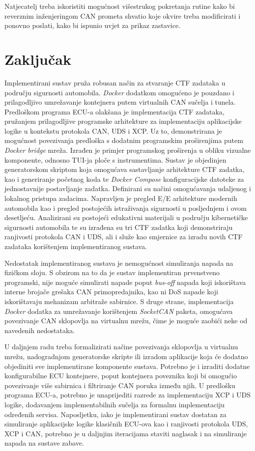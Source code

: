 \documentclass[times, utf8, diplomski, numeric]{fer}
\begin{document}
Natjecatelj treba iskoristiti mogućnost višestrukog pokretanja rutine kako bi reverznim inženjeringom CAN prometa shvatio koje okvire treba modificirati i ponovno poslati, kako bi ispunio uvjet za prikaz zastavice. 

\chapter{Zaključak}
Implementirani sustav pruža robusan način za stvaranje CTF zadataka u području sigurnosti automobila. \textit{Docker} dodatkom omogućeno je pouzdano i prilagodljivo umrežavanje kontejnera putem virtualnih CAN sučelja i tunela. Predloškom programa ECU-a olakšana je implementacija CTF zadataka, pružanjem prilagodljive programske arhitekture za implementaciju aplikacijske logike u kontekstu protokola CAN, UDS i XCP. Uz to, demonstrirana je mogućnost povezivanja predloška s dodatnim programskim proširenjima putem \textit{Docker bridge} mreža. Izrađen je primjer programskog proširenja u obliku vizualne komponente, odnosno TUI-ja ploče s instrumentima. Sustav je objedinjen generatorskom skriptom koja omogućava sastavljanje arhitekture CTF zadatka, kao i generiranje početnog koda te \textit{Docker Compose} konfiguracijske datoteke za jednostavnije postavljanje zadatka. Definirani su načini omogućavanja udaljenog i lokalnog pristupa zadacima. Napravljen je pregled E/E arhitekture modernih automobila kao i pregled postojećih istraživanja sigurnosti u posljednjem i ovom desetljeću. Analizirani su postojeći edukativni materijali u području kibernetičke sigurnosti automobila te su izrađena su tri CTF zadatka koji demonstriraju ranjivosti protokola CAN i UDS, ali i služe kao smjernice za izradu novih CTF zadataka korištenjem implementiranog sustava.

Nedostatak implementiranog sustava je nemogućnost simuliranja napada na fizičkom sloju. S obzirom na to da je sustav implementiran prvenstveno programski, nije moguće simulirati napade poput \textit{bus-off} napada koji iskorištava interne brojače grešaka CAN primopredajnika, kao ni DoS napade koji iskorištavaju mehanizam arbitraže sabirnice. S druge strane, implementacija \textit{Docker} dodatka za umrežavanje korištenjem \textit{SocketCAN} paketa, omogućava povezivanje CAN sklopovlja na virtualnu mrežu, čime je moguće zaobići neke od navedenih nedostataka. 

U daljnjem radu treba formalizirati načine povezivanja sklopovlja u virtualnu mrežu, nadogradnjom generatorske skripte ili izradom aplikacije koja će dodatno objediniti sve implementirane komponente sustava. Potrebno je i izraditi dodatne konfigurabilne ECU kontejnere, poput kontejnera poveznika koji bi omogućio povezivanje više sabirnica i filtriranje CAN poruka između njih. U predlošku programa ECU-a, potrebno je unaprijediti razrede za implementaciju XCP i UDS logike, dodavanjem implementabilnih sučelja za formalnu implementaciju određenih servisa. Naposljetku, iako je implementirani sustav dostatan za simuliranje aplikacijske logike klasičnih ECU-ova kao i ranjivosti protokola UDS, XCP i CAN, potrebno je u daljnjim iteracijama staviti naglasak i na simuliranje napada na sustave zabave.       
\end{document}
